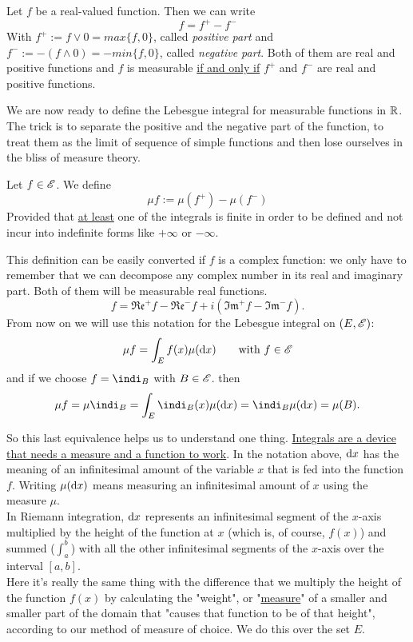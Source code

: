 \documentclass{report}
\begin{document}
\begin{revise}
\begin{enumerate}
\begin{remark}
				Let $f$ be a real-valued function. Then we can write
				\[f=f^+-f^-\]
				With $f^+:=f\vee0=max\{f,0\}$, called \emph{positive part} and $f^-:=-(f\wedge0)=-min\{f,0\}$, called \emph{negative part}. Both of them are real and positive functions and $f$ is measurable \underline{if and only if} $f^+$ and $f^-$ are real and positive functions.
			\end{remark}
		\end{enumerate}
		We are now ready to define the Lebesgue integral for measurable functions in $\mathbb{R}$. The trick is to separate the positive and the negative part of the function, to treat them as the limit of sequence of simple functions and then lose ourselves in the bliss of measure theory.
		\begin{definition}
			Let $f\in\mathscr{E}$. We define
			\[\mu f:=\mu(f^+)-\mu(f^-)\]
			Provided that \underline{at least} one of the integrals is finite in order to be defined and not incur into indefinite forms like $+\infty$ or $-\infty$.
		\end{definition}
		This definition can be easily converted if $f$ is a complex function: we only have to remember that we can decompose any complex number in its real and imaginary part. Both of them will be measurable real functions.
		\[f=\mathfrak{Re}^+f-\mathfrak{Re}^-f+i(\mathfrak{Im}^+f-\mathfrak{Im}^-f).\]
		From now on we will use this notation for the Lebesgue integral on $(E,\mathscr{E})$:
		\[\mu f=\int_Ef(x)\mu(\mathop{}\!\mathrm{d} x)\qquad\text{with }f\in\mathscr{E}\]
		and if we choose $f=\indi_B$ with $B\in\mathscr{E}$. then
		\[\mu f=\mu \indi_B=\int_E\indi_B(x)\mu(\dx)=\indi_B\mu(\dx)=\mu(B).\]\par
		So this last equivalence helps us to understand one thing. \underline{Integrals are a device that needs a measure and a function to work}. In the notation above, $\mathop{}\!\mathrm{d} x$ has the meaning of an infinitesimal amount of the variable $x$ that is fed into the function $f$. Writing $\mu(\mathop{}\!\mathrm{d} x)$ means measuring an infinitesimal amount of $x$ using the measure $\mu$.\\
		In Riemann integration, $\mathop{}\!\mathrm{d} x$ represents an infinitesimal segment of the $x$-axis multiplied by the height of the function at $x$ (which is, of course, $f(x)$) and summed ($\int_{a}^{b}$) with all the other infinitesimal segments of the $x$-axis over the interval $[a,b]$. \\
		Here it's really the same thing with the difference that we multiply the height of the function $f(x)$ by calculating the "weight", or "\underline{measure}" of a smaller and smaller part of the domain that "causes that function to be of that height", according to our method of measure of choice. We do this over the set $E$.\par	
	\end{revise}
\end{document}
